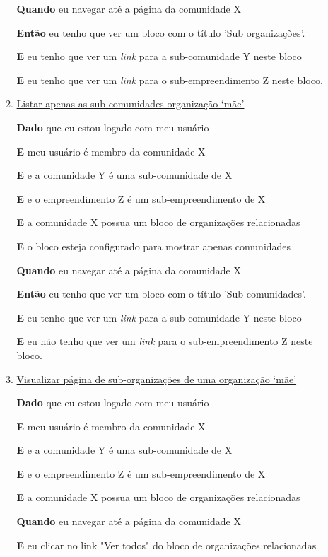 \begin{enumerate}
\begin{enumerate}
\textbf{Quando} eu navegar até a página da comunidade X

\textbf{Então} eu tenho que ver um bloco com o título 'Sub organizações'.

\textbf{E} eu tenho que ver um \textit{link} para a sub-comunidade Y neste
bloco

\textbf{E} eu tenho que ver um \textit{link} para o sub-empreendimento Z neste
bloco.

\item \underline{Listar apenas as sub-comunidades organização `mãe'}

\textbf{Dado} que eu estou logado com meu usuário

\textbf{E} meu usuário é membro da comunidade X

\textbf{E} e a comunidade Y é uma sub-comunidade de X

\textbf{E} e o empreendimento Z é um sub-empreendimento de X

\textbf{E} a comunidade X possua um bloco de organizações relacionadas

\textbf{E} o bloco esteja configurado para mostrar apenas comunidades

\textbf{Quando} eu navegar até a página da comunidade X

\textbf{Então} eu tenho que ver um bloco com o título 'Sub comunidades'.

\textbf{E} eu tenho que ver um \textit{link} para a sub-comunidade Y neste
bloco

\textbf{E} eu não tenho que ver um \textit{link} para o sub-empreendimento Z
neste bloco.

\item \underline{Visualizar página de sub-organizações de uma organização `mãe'}

\textbf{Dado} que eu estou logado com meu usuário

\textbf{E} meu usuário é membro da comunidade X

\textbf{E} e a comunidade Y é uma sub-comunidade de X

\textbf{E} e o empreendimento Z é um sub-empreendimento de X

\textbf{E} a comunidade X possua um bloco de organizações relacionadas

\textbf{Quando} eu navegar até a página da comunidade X

\textbf{E} eu clicar no link "Ver todos" do bloco de organizações relacionadas


\end{enumerate}
\end{enumerate}
